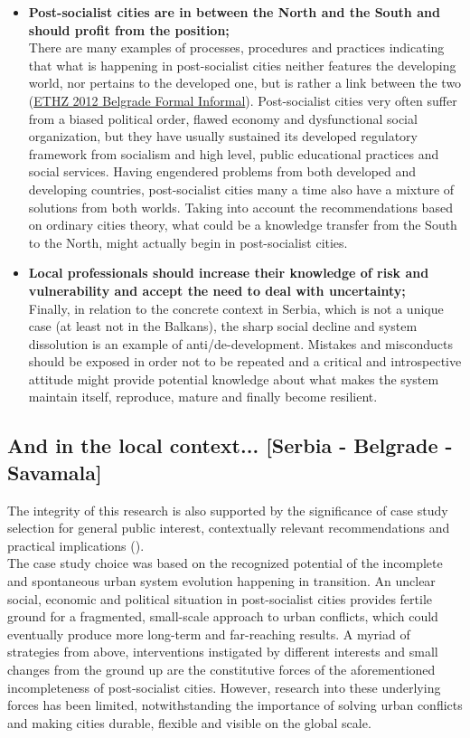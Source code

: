 \documentclass[11pt]{report}
\begin{document}
{{{\begin{itemize}
\item \textbf{Post-socialist cities are in between the North and the South and should profit from the position;}
\\
There are many examples of processes, procedures and practices indicating that what is happening in post-socialist cities neither features the developing world, nor pertains to the developed one, but is rather a link between the two (\href{ref}{ETHZ 2012 Belgrade Formal Informal}).
Post-socialist cities very often suffer from a biased political order, flawed economy and dysfunctional social organization, but they have usually sustained its developed regulatory framework from socialism and high level, public educational practices and social services. Having engendered problems from both developed and developing countries, post-socialist cities many a time also have a mixture of solutions from both worlds. Taking into account the recommendations based on ordinary cities theory, what could be a knowledge transfer from the South to the North, might actually begin in post-socialist cities.

\item {\textbf{Local professionals should increase their knowledge of risk and vulnerability and accept the need to deal with uncertainty;}}
\\
Finally, in relation to the concrete context in Serbia, which is not a unique case (at least not in the Balkans), the sharp social decline and system dissolution is an example of anti/de-development. Mistakes and misconducts should be exposed in order not to be repeated and a critical and introspective attitude might provide potential knowledge about what makes the system maintain itself, reproduce, mature and finally become resilient.
\end{itemize}

\subsection{And in the local context... [Serbia - Belgrade - Savamala]}

The integrity of this research is also supported by the significance of case study selection for general public interest, contextually relevant recommendations and practical implications (\href{ref}{\citealt{yin_case_2009}}).
\\

The case study choice was based on the recognized potential of the incomplete and spontaneous urban system evolution happening in transition. An unclear social, economic and political situation in post-socialist cities provides fertile ground for a fragmented, small-scale approach to urban conflicts, which could eventually produce more long-term and far-reaching results. A myriad of strategies from above, interventions instigated by different interests and small changes from the ground up are the constitutive forces of the aforementioned incompleteness of post-socialist cities. However, research into these underlying forces has been limited, notwithstanding the importance of solving urban conflicts and making cities durable, flexible and visible on the global scale.
\\

}}}
\end{document}
